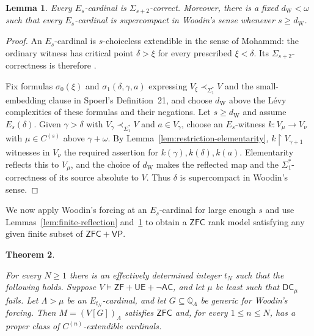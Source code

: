 \documentclass[11pt,a4paper]{amsart}
\newcommand{\VP}{\mathsf{VP}}
\newcommand{\AC}{\mathsf{AC}}
\newcommand{\ZF}{\mathsf{ZF}}
\newcommand{\ZFC}{\mathsf{ZFC}}
\newcommand{\restr}{\mathbin{\upharpoonright}}
\newcommand{\DC}{\mathsf{DC}}
\newcommand{\UE}{\mathsf{UE}}
\theoremstyle{plain}
\newtheorem{theorem}{Theorem}[section]
\newtheorem{lemma}[theorem]{Lemma}
\theoremstyle{definition}
\theoremstyle{remark}
\begin{document}
\begin{lemma}\label{lem:ordinary-correct-supercompact}
Every $E_s$-cardinal is $\Sigma_{s+2}$-correct.  Moreover, there is a fixed $d_{\mathrm W}<\omega$ such that every $E_s$-cardinal is supercompact in Woodin's sense whenever $s\geq d_{\mathrm W}$.
\end{lemma}

\begin{proof}
An $E_s$-cardinal is $s$-choiceless extendible in the sense of Mohammd: the ordinary witness has critical point $\delta>\xi$ for every prescribed $\xi<\delta$.  Its $\Sigma_{s+2}$-correctness is therefore \cite[Proposition~2.2]{Mohammd}.

Fix formulas $\sigma_0(\xi)$ and $\sigma_1(\delta,\gamma,a)$ expressing $V_\xi\prec_{\Sigma_1^*}V$ and the small-embedding clause in Spoerl's Definition~21, and choose $d_{\mathrm W}$ above the L\'evy complexities of these formulas and their negations.  Let $s\geq d_{\mathrm W}$ and assume $E_s(\delta)$.  Given $\gamma>\delta$ with $V_\gamma\prec_{\Sigma_1^*}V$ and $a\in V_\gamma$, choose an $E_s$-witness $k:V_\mu\to V_\nu$ with $\mu\in C^{(s)}$ above $\gamma+\omega$.  By Lemma~\ref{lem:restriction-elementarity}, $k\restr V_{\gamma+1}$ witnesses in $V_\nu$ the required assertion for $k(\gamma),k(\delta),k(a)$.  Elementarity reflects this to $V_\mu$, and the choice of $d_{\mathrm W}$ makes the reflected map and the $\Sigma_1^*$-correctness of its source absolute to $V$.  Thus $\delta$ is supercompact in Woodin's sense.
\end{proof}

We now apply Woodin's forcing at an $E_s$-cardinal for large enough $s$ and use Lemmas~\ref{lem:finite-reflection} and~\ref{lem:ordinary-correct-supercompact} to obtain a $\ZFC$ rank model satisfying any given finite subset of $\ZFC+\VP$.

\begin{theorem}\label{thm:finite-restoration}

For every $N\geq1$ there is an effectively determined integer $t_N$ such that the following holds.  Suppose $V\models\ZF+\UE+\neg\AC$, and let $\mu$ be least such that $\DC_\mu$ fails.  Let $\Lambda>\mu$ be an $E_{t_N}$-cardinal, and let $G\subseteq\mathbb Q_\Lambda$ be generic for Woodin's forcing.  Then $M=(V[G])_\Lambda$ satisfies $\ZFC$ and, for every $1\leq n\leq N$, has a proper class of $C^{(n)}$-extendible cardinals.
\end{theorem}
\end{document}
